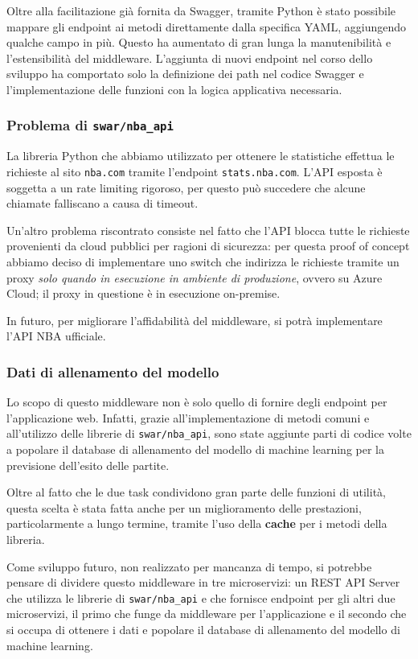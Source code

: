 Oltre alla facilitazione già fornita da Swagger, tramite Python è stato possibile mappare gli endpoint ai metodi direttamente dalla specifica YAML, aggiungendo qualche campo in più. Questo ha aumentato di gran lunga la manutenibilità e l'estensibilità del middleware. L'aggiunta di nuovi endpoint nel corso dello sviluppo ha comportato solo la definizione dei path nel codice Swagger e l'implementazione delle funzioni con la logica applicativa necessaria.

\subsubsection{Problema di \texttt{swar/nba\_api}}

La libreria Python che abbiamo utilizzato per ottenere le statistiche effettua le richieste al sito \texttt{nba.com} tramite l'endpoint \texttt{stats.nba.com}. L'API esposta è soggetta a un rate limiting rigoroso, per questo può succedere che alcune chiamate falliscano a causa di timeout.

Un'altro problema riscontrato consiste nel fatto che l'API blocca tutte le richieste provenienti da cloud pubblici per ragioni di sicurezza: per questa proof of concept abbiamo deciso di implementare uno switch che indirizza le richieste tramite un proxy \textit{solo quando in esecuzione in ambiente di produzione}, ovvero su Azure Cloud; il proxy in questione è in esecuzione on-premise.

In futuro, per migliorare l'affidabilità del middleware, si potrà implementare l'API NBA ufficiale.

\subsubsection{Dati di allenamento del modello}
Lo scopo di questo middleware non è solo quello di fornire degli endpoint per l'applicazione web. Infatti, grazie all'implementazione di metodi comuni e all'utilizzo delle librerie di \texttt{swar/nba\_api}, sono state aggiunte parti di codice volte a popolare il database di allenamento del modello di machine learning per la previsione dell'esito delle partite.

Oltre al fatto che le due task condividono gran parte delle funzioni di utilità, questa scelta è stata fatta anche per un miglioramento delle prestazioni, particolarmente a lungo termine, tramite l'uso della \textbf{cache} per i metodi della libreria.

Come sviluppo futuro, non realizzato per mancanza di tempo, si potrebbe pensare di dividere questo middleware in tre microservizi: un REST API Server che utilizza le librerie di \texttt{swar/nba\_api} e che fornisce endpoint per gli altri due microservizi, il primo che funge da middleware per l'applicazione e il secondo che si occupa di ottenere i dati e popolare il database di allenamento del modello di machine learning.
\newpage


